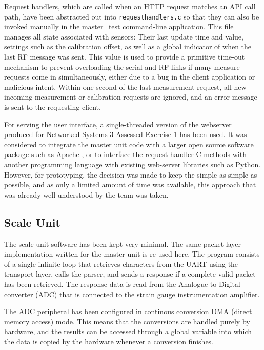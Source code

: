 Request handlers, which are called when an HTTP request matches an API call path, have been abstracted out into \texttt{requesthandlers.c} so that they can also be invoked manually in the master\_test command-line application. This file manages all state associated with sensors: Their last update time and value, settings such as the calibration offset, as well as a global indicator of when the last RF message was sent. This value is used to provide a primitive time-out mechanism to prevent overloading the serial and RF links if many measure requests come in simultaneously, either due to a bug in the client application or malicious intent. Within one second of the last measurement request, all new incoming measurement or calibration requests are ignored, and an error message is sent to the requesting client.

For serving the user interface, a single-threaded version of the webserver produced for Networked Systems 3 Assessed Exercise 1 \cite{ns3-coursework} has been used. It was considered to integrate the master unit code with a larger open source software package such as Apache \cite{apache}, or to interface the request handler C methods with another programming language with existing web-server libraries such as Python. However, for prototyping, the decision was made to keep the simple as simple as possible, and as only a limited amount of time was available, this approach that was already well understood by the team was taken.

\subsection{Scale Unit}
The scale unit software has been kept very minimal. The same packet layer implementation written for the master unit is re-used here. The program consists of a single infinite loop that retrieves characters from the UART using the transport layer, calls the parser, and sends a response if a complete valid packet has been retrieved. The response data is read from the Analogue-to-Digital converter (ADC) that is connected to the strain gauge instrumentation amplifier.

The ADC peripheral has been configured in continous conversion DMA (direct memory access) mode. This means that the conversions are handled purely by hardware, and the results can be accessed through a global variable into which the data is copied by the hardware whenever a conversion finishes.


